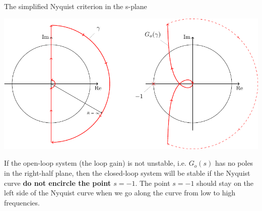 \documentclass[presentation,aspectratio=169]{beamer}
\begin{document}
\begin{frame}[label={sec:org2a3ed4a}]{The simplified Nyquist criterion in the s-plane}
\pause

\begin{center}
\includegraphics[width=0.65\linewidth]{../../figures/implane-nyquist-contour-map}
\end{center}

\pause

\begin{tcolorbox}
If the open-loop system (the loop gain) is not unstable, i.e. $G_o(s)$ has no poles in the right-half plane, then the closed-loop system will be stable if the Nyquist curve \textbf{do not encircle the point \(s=-1\)}. The point $s=-1$ should stay on the left side of the Nyquist curve when we go along the curve from low to high frequencies.
\end{tcolorbox}
\end{frame}
\end{document}
